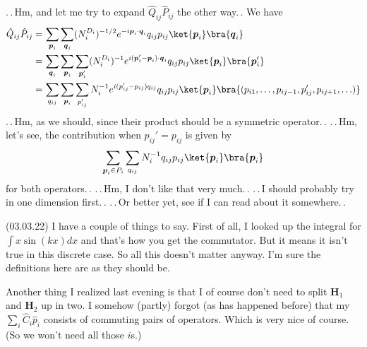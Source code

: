 \documentclass{report}
\begin{document}
.\,.\,Hm, and let me try to expand $\hat Q_{ij} \hat P_{ij}$ the other way.\,. We have
\begin{align}
\begin{aligned}
	\hat Q_{ij} \hat P_{ij} 
		=&\,
		\sum_{\boldsymbol{p}_i} \sum_{\boldsymbol{q}_i} 
			(N_i^{D_i})^{-1/2} 
			e^{- i \boldsymbol{p}_i \cdot \boldsymbol{q}_i} q_{ij} p_{ij} 
			\ket{\boldsymbol{p}_i} 
			\bra{\boldsymbol{q}_i} \\
		=&\,
		\sum_{\boldsymbol{q}_i} \sum_{\boldsymbol{p}_i} \sum_{\boldsymbol{p}_i'} 
			(N_i^{D_i})^{-1} 
			e^{i (\boldsymbol{p}_i' - \boldsymbol{p}_i) \cdot \boldsymbol{q}_i} q_{ij} p_{ij} 
			\ket{\boldsymbol{p}_i} 
			\bra{\boldsymbol{p}_i'} \\
		=&\,
		\sum_{q_{ij}} \sum_{\boldsymbol{p}_i} \sum_{p_{ij}'} 
			N_i^{-1} 
			e^{i (p_{ij}' - p_{ij}) q_{ij}} q_{ij} p_{ij} 
			\ket{\boldsymbol{p}_i} 
			\bra{(p_{i1}, \ldots, p_{i j-1}, p_{ij}', p_{i j+1}, \ldots)}
\end{aligned}
\end{align}
.\,.\,Hm, as we should, since their product should be a symmetric operator.\,. .\,.\,Hm, let's see, the contribution when $p_{ij}' = p_{ij}$ is given by 
\begin{align}
\begin{aligned}
	\sum_{\boldsymbol{p}_i \in P_i} \sum_{q_{ij}} 
		N_i^{-1}
		q_{ij} p_{ij} 
		\ket{\boldsymbol{p}_i} 
		\bra{\boldsymbol{p}_i}
\end{aligned}
\end{align}
for both operators.\,. .\,.\,Hm, I don't like that very much.\,. .\,.\,I should probably try in one dimension first.\,. .\,.\,Or better yet, see if I can read about it somewhere.\,. %


(03.03.22) I have a couple of things to say. First of all, I looked up the integral for $\int x \sin(kx) dx$ and that's how you get the commutator. But it means it isn't true in this discrete case. So all this doesn't matter anyway. I'm sure the definitions here are as they should be.

Another thing I realized last evening is that I of course don't need to split $\textbf{H}_1$ and $\textbf{H}_2$ up in two. I somehow (partly) forgot (as has happened before) that my $\sum_i \hat C_i \hat p_i$ consists of commuting pairs of operators. Which is very nice of course. (So we won't need all those $i$s.)
\end{document}
